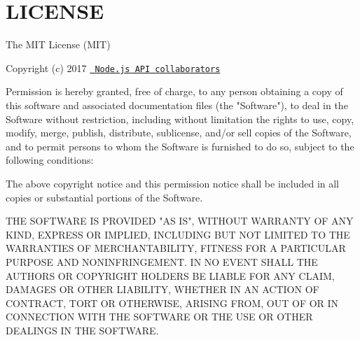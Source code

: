 \chapter{LICENSE}
\hypertarget{md_backend_2node__modules_2node-addon-api_2_l_i_c_e_n_s_e}{}\label{md_backend_2node__modules_2node-addon-api_2_l_i_c_e_n_s_e}
The MIT License (MIT)

Copyright (c) 2017 \href{https://github.com/nodejs/node-addon-api\#collaborators}{\texttt{ Node.\+js API collaborators}}

Permission is hereby granted, free of charge, to any person obtaining a copy of this software and associated documentation files (the "{}\+Software"{}), to deal in the Software without restriction, including without limitation the rights to use, copy, modify, merge, publish, distribute, sublicense, and/or sell copies of the Software, and to permit persons to whom the Software is furnished to do so, subject to the following conditions\+:

The above copyright notice and this permission notice shall be included in all copies or substantial portions of the Software.

THE SOFTWARE IS PROVIDED "{}\+AS IS"{}, WITHOUT WARRANTY OF ANY KIND, EXPRESS OR IMPLIED, INCLUDING BUT NOT LIMITED TO THE WARRANTIES OF MERCHANTABILITY, FITNESS FOR A PARTICULAR PURPOSE AND NONINFRINGEMENT. IN NO EVENT SHALL THE AUTHORS OR COPYRIGHT HOLDERS BE LIABLE FOR ANY CLAIM, DAMAGES OR OTHER LIABILITY, WHETHER IN AN ACTION OF CONTRACT, TORT OR OTHERWISE, ARISING FROM, OUT OF OR IN CONNECTION WITH THE SOFTWARE OR THE USE OR OTHER DEALINGS IN THE SOFTWARE. 
